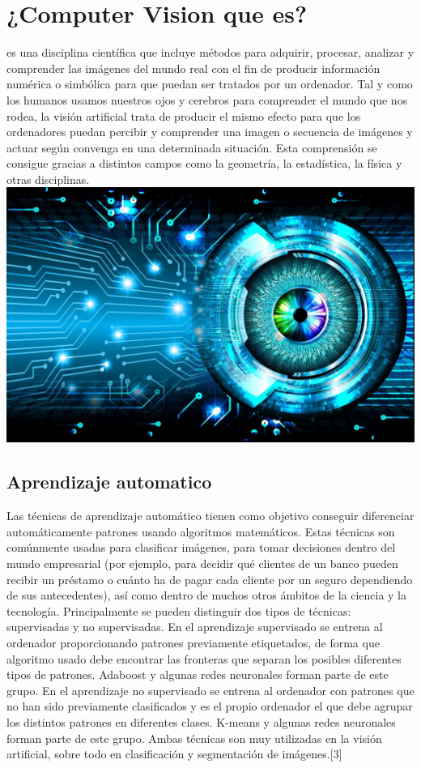 \documentclass[twocolumn]{article}
\begin{document}
\section{¿Computer Vision que es?}
es una disciplina científica que incluye métodos para adquirir, procesar,
 analizar y comprender las imágenes del mundo real con el fin de producir información
  numérica o simbólica para que puedan ser tratados por un ordenador. Tal y como los 
  humanos usamos nuestros ojos y cerebros para comprender el mundo que nos rodea, la 
  visión artificial trata de producir el mismo efecto para que los ordenadores puedan 
  percibir y comprender una imagen o secuencia de imágenes y actuar según convenga en 
  una determinada situación. Esta comprensión se consigue gracias a distintos campos 
  como la geometría, la estadística, la física y otras disciplinas.
\includegraphics[width=1.02\linewidth]{img/vs.jpg}
  
  \subsection{Aprendizaje automatico}
Las técnicas de aprendizaje automático tienen como objetivo conseguir diferenciar 
automáticamente patrones usando algoritmos matemáticos. Estas técnicas son comúnmente 
usadas para clasificar imágenes, para tomar decisiones dentro del mundo empresarial 
(por ejemplo, para decidir qué clientes de un banco pueden recibir un préstamo o cuánto 
ha de pagar cada cliente por un seguro dependiendo de sus antecedentes), así como dentro 
de muchos otros ámbitos de la ciencia y la tecnología. Principalmente se pueden distinguir 
dos tipos de técnicas: supervisadas y no supervisadas.
En el aprendizaje supervisado se entrena al ordenador proporcionando patrones previamente 
etiquetados, de forma que algoritmo usado debe encontrar las fronteras que separan los posibles 
diferentes tipos de patrones. Adaboost y algunas redes neuronales forman parte de este grupo.
En el aprendizaje no supervisado se entrena al ordenador con patrones que no han sido 
previamente clasificados y es el propio ordenador el que debe agrupar los distintos patrones 
en diferentes clases. K-means y algunas redes neuronales forman parte de este grupo.
Ambas técnicas son muy utilizadas en la visión artificial, sobre todo en clasificación y 
segmentación de imágenes.[3]
\end{document}

